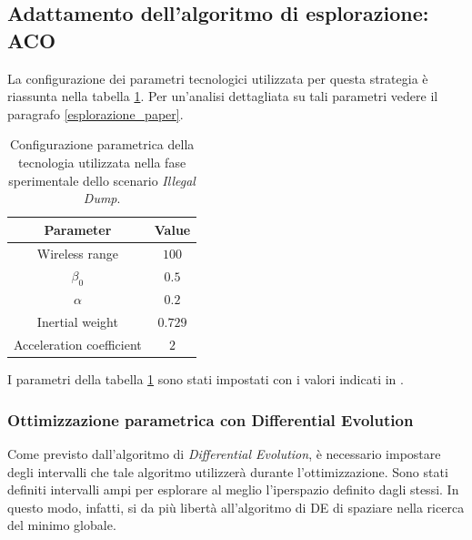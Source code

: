 \subsection{Adattamento dell'algoritmo di esplorazione: ACO}

La configurazione dei parametri tecnologici utilizzata per questa strategia è riassunta nella tabella \ref{tabella_parametri_dump_ACO}.
Per un'analisi dettagliata su tali parametri vedere il paragrafo \ref{esplorazione_paper}.

\begin{table}[H]
    \centering
    \captionsetup{justification=centering, margin=2cm, font=footnotesize}
    \begin{tabular}{|c|c|}
    \hline
    \textbf{Parameter}                      & \textbf{Value}        \\ \hline
    Wireless range                          & $100$                 \\ \hline
    $\beta_{0}$                             & $0.5$                 \\ \hline
    $\alpha$                                & $0.2$                 \\ \hline
    Inertial weight                         & $0.729$               \\ \hline
    Acceleration coefficient                & $2$                   \\ \hline
    \end{tabular}%
    
    \caption{Configurazione parametrica della tecnologia utilizzata nella fase sperimentale dello scenario \textit{Illegal Dump}.}
    \label{tabella_parametri_dump_ACO}
\end{table}
I parametri della tabella \ref{tabella_parametri_dump_ACO} sono stati impostati con i valori indicati in \cite{palmieri2017comparison}.

\subsubsection{Ottimizzazione parametrica con Differential Evolution}

Come previsto dall'algoritmo di \textit{Differential Evolution}, è necessario impostare degli intervalli che tale algoritmo utilizzerà durante l'ottimizzazione.
Sono stati definiti intervalli ampi per esplorare al meglio l'iperspazio definito dagli stessi.
In questo modo, infatti, si da più libertà all'algoritmo di DE di spaziare nella ricerca del minimo globale.

